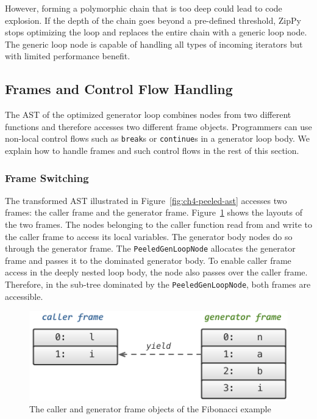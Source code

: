 However, forming a polymorphic chain that is too deep could lead to code explosion.
If the depth of the chain goes beyond a pre-defined threshold, ZipPy stops optimizing the loop and replaces the entire chain with a generic loop node.
The generic loop node is capable of handling all types of incoming iterators but with limited performance benefit.

\subsection{Frames and Control Flow Handling}
\label{sec:ch4-frame-and-control}

The AST of the optimized generator loop combines nodes from two different functions and therefore accesses two different frame objects.
Programmers can use non-local control flows such as \texttt{break}s or \texttt{continue}s in a generator loop body.
We explain how to handle frames and such control flows in the rest of this section.

\subsubsection*{Frame Switching}

The transformed AST illustrated in Figure~\ref{fig:ch4-peeled-ast} accesses two frames: the caller frame and the generator frame.
Figure~\ref{fig:ch4-two-frames} shows the layouts of the two frames.
The nodes belonging to the caller function read from and write to the caller frame to access its local variables.
The generator body nodes do so through the generator frame.
The \texttt{PeeledGenLoopNode} allocates the generator frame and passes it to the dominated generator body.
To enable caller frame access in the deeply nested loop body, the node also passes over the caller frame.
Therefore, in the sub-tree dominated by the \texttt{PeeledGenLoopNode}, both frames are accessible.

\begin{figure}[!ht]
\centering
\includegraphics[scale=1.2]{figures/ch4-two-frames}
\caption{The caller and generator frame objects of the Fibonacci example}
\label{fig:ch4-two-frames}
\end{figure}


